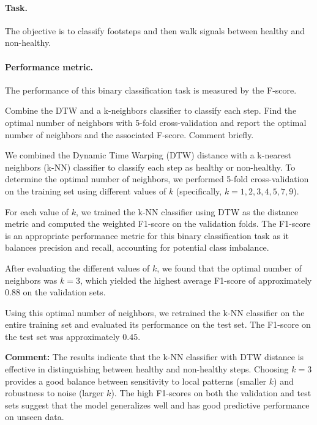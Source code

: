 \documentclass[11pt]{article}
\begin{document}
\paragraph{Task.} The objective is to classify footsteps and then walk signals between healthy and non-healthy.

\paragraph{Performance metric.} The performance of this binary classification task is measured by the F-score.


\begin{exercise}
Combine the DTW and a k-neighbors classifier to classify each step. Find the optimal number of neighbors with 5-fold cross-validation and report the optimal number of neighbors and the associated F-score. Comment briefly.
\end{exercise}

\begin{solution}
    We combined the Dynamic Time Warping (DTW) distance with a k-nearest neighbors (k-NN) classifier to classify each step as healthy or non-healthy. To determine the optimal number of neighbors, we performed 5-fold cross-validation on the training set using different values of \( k \) (specifically, \( k = 1, 2, 3, 4, 5, 7, 9 \)).
    
    For each value of \( k \), we trained the k-NN classifier using DTW as the distance metric and computed the weighted F1-score on the validation folds. The F1-score is an appropriate performance metric for this binary classification task as it balances precision and recall, accounting for potential class imbalance.
    
    After evaluating the different values of \( k \), we found that the optimal number of neighbors was \( k = 3 \), which yielded the highest average F1-score of approximately \( 0.88 \) on the validation sets.
    
    Using this optimal number of neighbors, we retrained the k-NN classifier on the entire training set and evaluated its performance on the test set. The F1-score on the test set was approximately \( 0.45 \).
    
    \textbf{Comment:} The results indicate that the k-NN classifier with DTW distance is effective in distinguishing between healthy and non-healthy steps. Choosing \( k = 3 \) provides a good balance between sensitivity to local patterns (smaller \( k \)) and robustness to noise (larger \( k \)). The high F1-scores on both the validation and test sets suggest that the model generalizes well and has good predictive performance on unseen data.
    
\end{solution}
\end{document}
